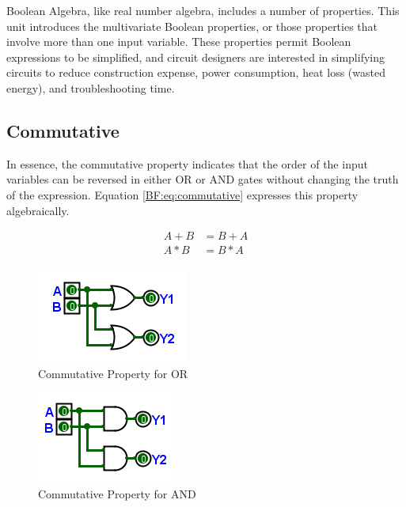 Boolean Algebra, like real number algebra, includes a number of properties. This unit introduces the multivariate Boolean properties, or those properties that involve more than one input variable. These properties permit Boolean expressions to be simplified, and circuit designers are interested in simplifying circuits to reduce construction expense, power consumption, heat loss (wasted energy), and troubleshooting time.  

\subsection{Commutative}
\label{BF:subsec:commutative_property}


In essence, the commutative property indicates that the order of the input variables can be reversed in either \textsf{OR} or \textsf{AND} gates without changing the truth of the expression. Equation \ref{BF:eq:commutative} expresses this property algebraically.

\begin{align}
  \label{BF:eq:commutative}
  A + B &= B + A \\
  \nonumber
  A * B &= B * A
\end{align}

\begin{figure}[H]
	\centering
	\includegraphics[width=\maxwidth{.95\linewidth}]{gfx/04_19}
	\caption{Commutative Property for OR}
	\label{fig:04_19}
\end{figure}


\begin{figure}[H]
	\centering
	\includegraphics[width=\maxwidth{.95\linewidth}]{gfx/04_20}
	\caption{Commutative Property for AND}
	\label{fig:04_20}
\end{figure}

